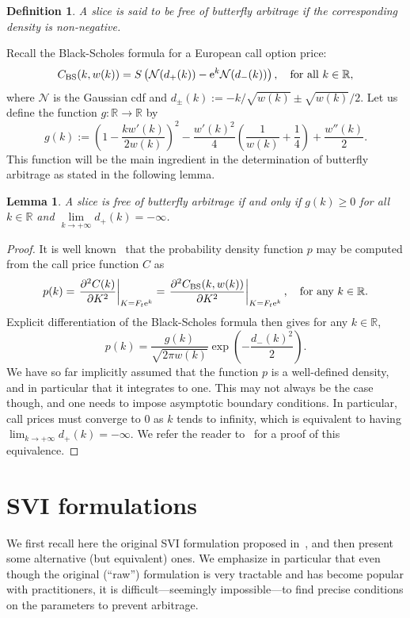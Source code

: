 \documentclass[12pt]{article}
\newtheorem{definition}{Definition}[section]
\newtheorem{lemma}{Lemma}[section]
\numberwithin{equation}{section}
\newcommand{\Ex}{\mathrm{e}}
\newcommand{\BS}{\rm BS}
\begin{document}
\begin{definition}\label{def:ButterflyArb}
A slice is said to be free of butterfly arbitrage if the corresponding density is non-negative.
\end{definition}
Recall the Black-Scholes formula for a European call option price:
$$
C_{\BS}(k,w(k))=S\left(\mathcal{N}(d_+(k))-\Ex^{k}\mathcal{N}(d_-(k))\right),
\quad\text{for all }k\in\mathbb{R},
$$
where $\mathcal{N}$ is the Gaussian cdf and 
$d_{\pm}(k):=-k/\sqrt{w(k)}\pm\sqrt{w(k)}/2$.
Let us define the function $g:\mathbb{R}\to\mathbb{R}$ by
\begin{equation}\label{eq:gBut}
g(k):=\left(1-\frac{k w'(k)}{2 w(k)}\right)^2-\frac{w'(k)^2}{4}\left(\frac{1}{w(k)}+\frac{1}{4} \right)
+\frac{w''(k)}{2}.
\end{equation}
This function will be the main ingredient in the determination of butterfly arbitrage as stated in the following lemma.
\begin{lemma}\label{lem:NoButterflyArb}
A slice is free of butterfly arbitrage if and only if $g(k)\geq 0$ for all $k\in\mathbb{R}$
and $\lim\limits_{k\to+\infty}d_+(k)=-\infty$.
\end{lemma}

\begin{proof}
It is well known~\cite{Breeden} that the probability density function $p$ may be computed from the call price function $C$ as
$$
p(k) = \left.\frac{\partial^2 C(k)}{\partial K^2}\right|_{K=F_t\Ex^k}
 = \left.\frac{\partial^2 C_{\BS}(k,w(k))}{\partial K^2}\right|_{K=F_t\Ex^k},
\quad\text{for any }k\in\mathbb{R}.
$$
Explicit differentiation of the Black-Scholes formula then gives for any $k\in\mathbb{R}$,
$$
p(k)=\frac{g(k)} {\sqrt{2 \pi w(k)}}\exp\left(-\frac{d_-(k)^2}{2}\right).
$$
We have so far implicitly assumed that the function $p$ is a well-defined density, 
and in particular that it integrates to one.
This may not always be the case though, and one needs to impose asymptotic boundary conditions.
In particular, call prices must converge to 0 as $k$ tends to infinity, 
which is equivalent to having $\lim_{k\to+\infty}d_+(k)=-\infty$.
We refer the reader to~\cite{RT10} for a proof of this equivalence.
\end{proof}


 
\section{SVI formulations}\label{sec:parameterizations}
We first recall here the original SVI formulation proposed in~\cite{Gatheral:2004}, and then present some alternative (but equivalent) ones.
We emphasize in particular that even though the original (``raw'') formulation is very tractable and has become popular 
with practitioners, it is difficult---seemingly impossible---to find precise conditions on the parameters to prevent arbitrage.
\end{document}
